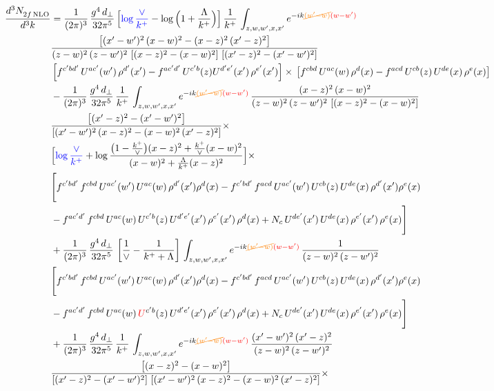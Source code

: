 \documentclass[9pt]{article}
\numberwithin{equation}{section}
\begin{document}
\begin{align}
    \frac{d^{3}N_{2f\,\rm NLO}^{\rm}}{d^{3}k}  & = \frac{1}{(2\pi)^{3}}\, \frac{g^{4}\,d_{\perp}}{32\pi^{5}}\,\Big[{\color{blue}\log\frac{\vee}{k^{+}}}-\log\Big(1+\frac{\Lambda}{k^{+}}\Big)\Big]\,\frac{1}{k^{+}}\,\int_{z,w,w^{\prime},x,x'} e^{-ik{\color{orange}\cancel{(w^{\prime}-w)}}{\color{red}(w-w^{\prime})}}\,\notag \\ & \frac{\left[(x'-w')^{2}\, (x-w)^{2} - (x-z)^{2}\, (x'-z)^{2}\right]}{(z-w)^{2}\, (z-w')^{2}\,\left[(x-z)^{2} - (x-w)^{2}\right]\, \left[(x'-z)^{2} - (x'-w')^{2}\right]}\notag \\ &   \left[f^{c'bd'}\, U^{ac'}(w')\,\rho^{d'}(x')-f^{ac'd'}\, U^{c'b}(z)U^{d'e'}(x')\, \rho^{e'}(x')\right]\times\, \left[f^{cbd}\, U^{ac}(w)\,\rho^{d}(x) - f^{acd}\, U^{cb}(z)\,U^{de}(x)\, \rho^{e}(x)\right] \notag \\ & - \frac{1}{(2\pi)^{3}}\, \frac{g^{4}\,d_{\perp}}{32\pi^{5}}\,\frac{1}{k^{+}}\,\int_{z,w,w^{\prime},x,x'} e^{-ik{\color{orange}\cancel{(w^{\prime}-w)}}{\color{red}(w-w^{\prime})}}\,\frac{(x-z)^{2}\, (x-w)^{2}}{(z-w)^{2}\, (z-w')^{2}\,\left[(x-z)^{2} - (x-w)^{2}\right]}\,\notag \\ & \frac{\left[(x'-z)^{2}-(x'-w')^{2}\right]}{\left[(x'-w')^{2}\, (x-z)^{2} - (x-w)^{2}\, (x'-z)^{2}\right]}\times\notag \\ & \Big[{\color{blue}\log\frac{\vee}{k^{+}}}+\log\frac{\big(1-\frac{k^{+}}{\vee}\big)(x-z)^{2}+\frac{k^{+}}{\vee}(x-w)^{2}}{(x-w)^{2}+\frac{\Lambda}{k^{+}}(x-z)^{2}}\Big]\times\notag \\ & \Bigg[f^{c'bd'}\,f^{cbd}\, U^{ac'}(w')\,U^{ac}(w)\,\rho^{d'}(x')\rho^{d}(x)- f^{c'bd'}\,f^{acd}\,U^{ac'}(w')\,U^{cb}(z)\,U^{de}(x)\,\rho^{d'}(x')\rho^{e}(x) \notag \\ & -f^{ac'd'}\,f^{cbd}\,U^{ac}(w)\,U^{c'b}(z)\,U^{d'e'}(x')\,\rho^{e'}(x')\,\rho^{d}(x) +N_{c}\,U^{de'}(x')\,U^{de}(x)\,\rho^{e'}(x')\,\rho^{e}(x)\Bigg] \notag \\ & + \frac{1}{(2\pi)^{3}}\, \frac{g^{4}\,d_{\perp}}{32\pi^{5}}\,\left[\frac{1}{\vee} - \frac{1}{k^{+} + \Lambda}\right]\,\int_{z,w,w^{\prime},x,x'} e^{-ik{\color{orange}\cancel{(w^{\prime}-w)}}{\color{red}(w-w^{\prime})}}\,\frac{1}{(z-w)^{2}\, (z-w')^{2}}\notag \\ & \Bigg[f^{c'bd'}\,f^{cbd}\, U^{ac'}(w')\,U^{ac}(w)\,\rho^{d'}(x')\rho^{d}(x)- f^{c'bd'}\,f^{acd}\,U^{ac'}(w')\,U^{cb}(z)\,U^{de}(x)\,\rho^{d'}(x')\rho^{e}(x) \notag \\ & -f^{ac'd'}\,f^{cbd}\,U^{ac}(w)\,{\color{red}U}^{c'b}(z)\,U^{d'e'}(x')\,\rho^{e'}(x')\,\rho^{d}(x) +N_{c}\,U^{de'}(x')\,U^{de}(x)\,\rho^{e'}(x')\,\rho^{e}(x)\Bigg] \notag \\ & + \frac{1}{(2\pi)^{3}}\, \frac{g^{4}\,d_{\perp}}{32\pi^{5}}\,\frac{1}{k^{+}}\,\int_{z,w,w^{\prime},x,x'} e^{-ik{\color{orange}\cancel{(w^{\prime}-w)}}{\color{red}(w-w^{\prime})}}\,\frac{(x'-w')^{2}\, (x'-z)^{2}}{(z-w)^{2}\, (z-w')^{2}}\notag \\ & \frac{\left[(x-z)^{2} - (x-w)^{2}\right]}{\left[(x'-z)^{2} - (x'-w')^{2}\right]\, \left[(x'-w')^{2}\, (x - z)^{2} - (x-w)^{2}\,(x'-z)^{2}\right]}\times\, 
\end{align}
\end{document}

